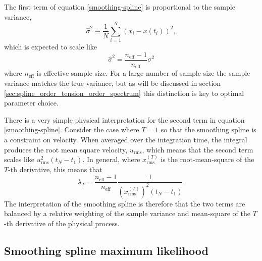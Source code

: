 \documentclass[10pt,journal]{IEEEtran}
\begin{document}
The first term of equation \ref{smoothing-spline} is proportional to the sample variance,
\begin{equation}
\label{sample_variance}
\hat{\sigma}^2  \equiv \frac{1}{N} \sum_{i=1}^{N} \left( x_i - x(t_i) \right) ^2,
\end{equation}
which is expected to scale like
\begin{equation}
\label{sample_variance_variance}
\hat{\sigma}^2 = \frac{n_{\textrm{eff}}-1}{n_{\textrm{eff}}} \sigma^2
\end{equation}
where $n_{\textrm{eff}}$ is effective sample size. For a large number of sample size the sample variance matches the true variance, but as will be discussed in section \ref{sec:spline_order_tension_order_spectrum} this distinction is key to optimal parameter choice.

There is a very simple physical interpretation for the second term in equation \ref{smoothing-spline}. Consider the case where $T=1$ so that the smoothing spline is a constraint on velocity. When averaged over the integration time, the integral produces the root mean square velocity, $u_{\textrm{rms}}$, which means that the second term scales like $u_{\textrm{rms}}^2 (t_N-t_1)$. In general, where $x^{(T)}_{\textrm{rms}}$ is the root-mean-square of the $T$-th derivative, this means that
\begin{equation}
\label{lambda}
\lambda_T = \frac{n_{\textrm{eff}}-1}{n_{\textrm{eff}}} \frac{1}{ \left(x^{(T)}_{\textrm{rms}}\right)^2 (t_N-t_1)}.
\end{equation}
The interpretation of the smoothing spline is therefore that the two terms are balanced by a relative weighting of the sample variance and mean-square of the $T$-th derivative of the physical process.

\subsection{Smoothing spline maximum likelihood}
\label{sec:maximum_lielihood}
\end{document}
